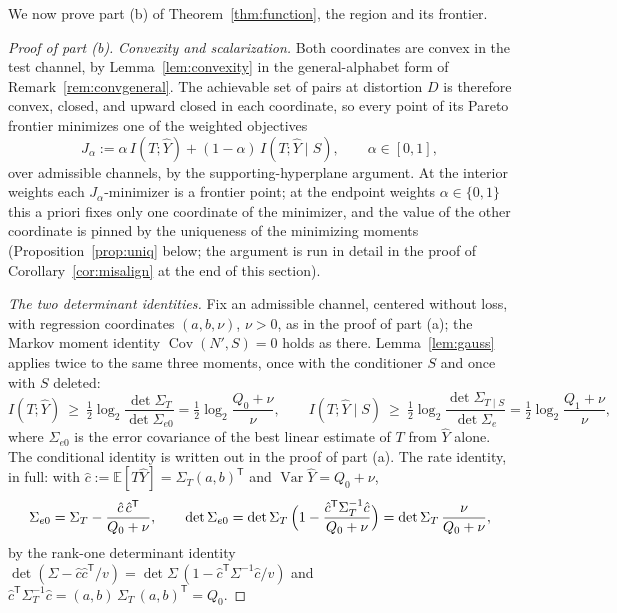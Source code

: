 \documentclass[11pt,onecolumn]{IEEEtran}
\newcommand{\E}{\mathbb{E}}
\newcommand{\Cov}{\operatorname{Cov}}
\newcommand{\hY}{\widehat{Y}}
\begin{document}
We now prove part (b) of Theorem~\ref{thm:function}, the region and its
frontier.

\begin{proof}[Proof of part (b)]
\emph{Convexity and scalarization.} Both coordinates are convex in the
test channel, by Lemma~\ref{lem:convexity} in the general-alphabet form
of Remark~\ref{rem:convgeneral}.
The achievable set of pairs at distortion $D$ is therefore convex,
closed, and upward closed in each coordinate, so every point of its
Pareto frontier minimizes one of the weighted objectives
\[
J_\alpha:=\alpha\,I(T;\hY)+(1-\alpha)\,I(T;\hY\mid S),
\qquad\alpha\in[0,1],
\]
over admissible channels, by the supporting-hyperplane argument. At
the interior weights each $J_\alpha$-minimizer is a frontier point;
at the endpoint weights $\alpha\in\{0,1\}$ this a priori fixes only
one coordinate of the minimizer, and the value of the other
coordinate is pinned by the uniqueness of the minimizing moments
(Proposition~\ref{prop:uniq} below; the argument is run in detail in
the proof of Corollary~\ref{cor:misalign} at the end of this section).

\emph{The two determinant identities.} Fix an admissible channel,
centered without loss, with regression coordinates $(a,b,\nu)$, $\nu>0$,
as in the proof of part (a); the Markov moment
identity $\Cov(N',S)=0$ holds as there. Lemma~\ref{lem:gauss} applies
twice to the same three moments, once with the conditioner $S$ and once
with $S$ deleted:
\begin{equation}
I(T;\hY)\ \ge\
\tfrac12\log_2\frac{\det\Sigma_T}{\det\Sigma_{e0}}
=\tfrac12\log_2\frac{Q_0+\nu}{\nu},
\qquad
I(T;\hY\mid S)\ \ge\
\tfrac12\log_2\frac{\det\Sigma_{T\mid S}}{\det\Sigma_{e}}
=\tfrac12\log_2\frac{Q_1+\nu}{\nu},
\label{eq:two-detids}
\end{equation}
where $\Sigma_{e0}$ is the error covariance of the best linear
estimate of $T$ from $\hY$ alone. The conditional identity is written
out in the proof of part (a). The rate identity, in
full: with $\hat c:=\E[T\hY]=\Sigma_T(a,b)^{\mathsf T}$ and
$\operatorname{Var}\hY=Q_0+\nu$,
\[
\Sigma_{e0}=\Sigma_T-\frac{\hat c\,\hat c^{\mathsf T}}{Q_0+\nu},
\qquad
\det\Sigma_{e0}
=\det\Sigma_T\,
\Bigl(1-\frac{\hat c^{\mathsf T}\Sigma_T^{-1}\hat c}{Q_0+\nu}\Bigr)
=\det\Sigma_T\,\frac{\nu}{Q_0+\nu},
\]
by the rank-one determinant identity
$\det(\Sigma-\hat c\hat c^{\mathsf T}/v)
=\det\Sigma\,(1-\hat c^{\mathsf T}\Sigma^{-1}\hat c/v)$ and
$\hat c^{\mathsf T}\Sigma_T^{-1}\hat c
=(a,b)\,\Sigma_T\,(a,b)^{\mathsf T}=Q_0$.


\end{proof}
\end{document}
